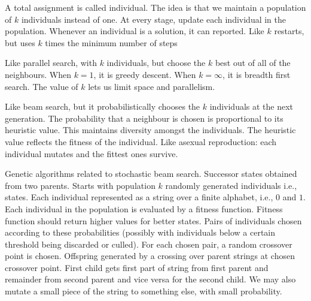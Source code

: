 \documentclass[a4paper]{article}
\theoremstyle{plain}
\theoremstyle{definition}
\newtheorem{defn}{Definition}[section]
\theoremstyle{remark}
\begin{document}
\begin{tcolorbox}[colback=black!3!white,colframe=black!60!white,title=\begin{defn}Parallel Search \label{Parallel Search}\end{defn}]
A total assignment is called individual. The idea is that we maintain a population of $k$ individuals instead of one. At every stage, update each individual in the population. Whenever an individual is a solution, it can reported. Like $k$ restarts, but uses $k$ times the minimum number of steps
\end{tcolorbox}
\begin{tcolorbox}[colback=black!3!white,colframe=black!60!white,title=\begin{defn}Beam Search \label{Beam Search}\end{defn}]
Like parallel search, with $k$ individuals, but choose the $k$ best out of all of the neighbours. When $k=1$, it is greedy descent. When $k = \infty$, it is breadth first search. The value of $k$ lets us limit space and parallelism.
\end{tcolorbox}
\begin{tcolorbox}[colback=black!3!white,colframe=black!60!white,title=\begin{defn}Stochastic Beam Search \label{Stochastic Beam Search}\end{defn}]
Like beam search, but it probabilistically chooses the $k$ individuals at the next generation. The probability that a neighbour is chosen is proportional to its heuristic value. This maintains diversity amongst the individuals. The heuristic value reflects the fitness of the individual. Like asexual reproduction: each individual mutates and the fittest ones survive.
\end{tcolorbox}
\begin{tcolorbox}[colback=black!3!white,colframe=black!60!white,title=\begin{defn}Genetic Algorithms \label{Genetic Algorithms}\end{defn}]
Genetic algorithms related to stochastic beam search. Successor states obtained from two parents. Starts with population $k$ randomly generated individuals i.e., states. Each individual represented as a string over a finite alphabet, i.e., $0$ and $1$. Each individual in the population is evaluated by a fitness function. Fitness function should return higher values for better states. Pairs of individuals chosen according to these probabilities (possibly with individuals below a certain threshold being discarded or culled). For each chosen pair, a random crossover point is chosen. Offspring generated by a crossing over parent strings at chosen crossover point. First child gets first part of string from first parent and remainder from second parent and vice versa for the second child. We may also mutate a small piece of the string to something else, with small probability. 
\end{tcolorbox}
\end{document}
